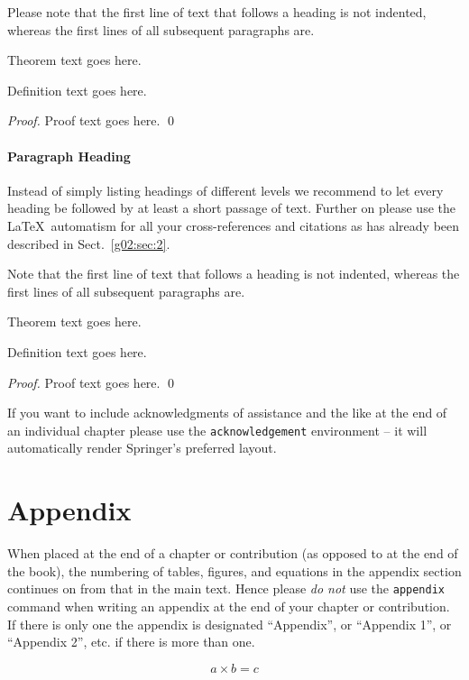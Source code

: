 \documentclass[graybox]{svmult}
\begin{document}
Please note that the first line of text that follows a heading is not indented, whereas the first lines of all subsequent paragraphs are.

\begin{theorem}
Theorem text goes here.
\end{theorem}
%
%
\begin{definition}
Definition text goes here.
\end{definition}

\begin{proof}
Proof text goes here.
\qed
\end{proof}

\paragraph{Paragraph Heading} %
Instead of simply listing headings of different levels we recommend to let every heading be followed by at least a short passage of text. Further on please use the \LaTeX\ automatism for all your cross-references and citations as has already been described in Sect.~\ref{g02:sec:2}.

Note that the first line of text that follows a heading is not indented, whereas the first lines of all subsequent paragraphs are.
%
%
\begin{theorem}
Theorem text goes here.
\end{theorem}
%
\begin{definition}
Definition text goes here.
\end{definition}
%
\begin{proof}
\smartqed
Proof text goes here.
\qed
\end{proof}
%
\begin{acknowledgement}
If you want to include acknowledgments of assistance and the like at the end of an individual chapter please use the \verb|acknowledgement| environment -- it will automatically render Springer's preferred layout.
\end{acknowledgement}
%
\section*{Appendix}
%
%
When placed at the end of a chapter or contribution (as opposed to at the end of the book), the numbering of tables, figures, and equations in the appendix section continues on from that in the main text. Hence please \textit{do not} use the \verb|appendix| command when writing an appendix at the end of your chapter or contribution. If there is only one the appendix is designated ``Appendix'', or ``Appendix 1'', or ``Appendix 2'', etc. if there is more than one.

\begin{equation}
a \times b = c
\end{equation}
\end{document}
